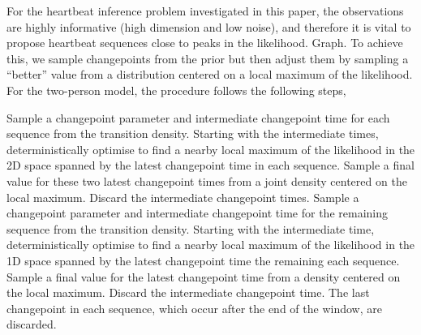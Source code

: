 \documentclass{article}
\begin{document}
For the heartbeat inference problem investigated in this paper, the observations are highly informative (high dimension and low noise), and therefore it is vital to propose heartbeat sequences close to peaks in the likelihood. {\meta Graph.} To achieve this, we sample changepoints from the prior but then adjust them by sampling a ``better'' value from a distribution centered on a local maximum of the likelihood. For the two-person model, the procedure follows the following steps,
%
\begin{algorithmic}[1]
    \STATE Sample a changepoint parameter and intermediate changepoint time for each sequence from the transition density.
    \STATE Starting with the intermediate times, deterministically optimise to find a nearby local maximum of the likelihood in the 2D space spanned by the latest changepoint time in each sequence.
    \STATE Sample a final value for these two latest changepoint times from a joint density centered on the local maximum.
    \STATE Discard the intermediate changepoint times.
  \ENDWHILE
    \STATE Sample a changepoint parameter and intermediate changepoint time for the remaining sequence from the transition density.
    \STATE Starting with the intermediate time, deterministically optimise to find a nearby local maximum of the likelihood in the 1D space spanned by the latest changepoint time the remaining each sequence.
    \STATE Sample a final value for the latest changepoint time from a density centered on the local maximum.
    \STATE Discard the intermediate changepoint time.
  \ENDWHILE
  \STATE The last changepoint in each sequence, which occur after the end of the window, are discarded.
\end{algorithmic}
\end{document}
